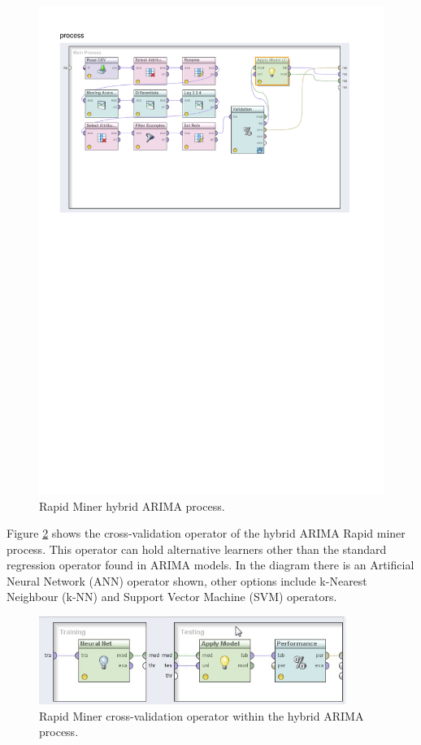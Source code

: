 \begin{figure}[!tbh]
\centering
\includegraphics[width=12cm]{../Figures/chp_ts_rm_arima}
\caption[Rapid Miner hybrid ARIMA process]{Rapid Miner hybrid ARIMA process.}
\label{fig:chp_ts_rm_arima}
\end{figure}

Figure \ref{fig:chp_ts_rm_arima_validation} shows the cross-validation operator of the hybrid ARIMA Rapid miner process. This operator can hold alternative learners other than the standard regression operator found in ARIMA models. In the diagram there is an Artificial Neural Network (ANN) operator shown, other options include k-Nearest Neighbour (k-NN) and Support Vector Machine (SVM) operators.

\begin{figure}[h!]
\centering
\includegraphics[width=10cm]{../Figures/chp_ts_rm_arima_validation}
\caption[Rapid Miner cross-validation operator]{Rapid Miner cross-validation operator within the hybrid ARIMA process.}
\label{fig:chp_ts_rm_arima_validation}
\end{figure}

